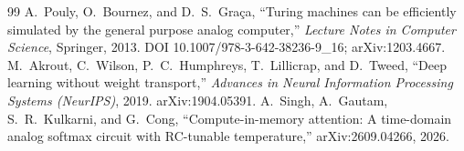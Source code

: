\documentclass[11pt]{article}
\begin{document}
\begin{thebibliography}{99}
 A.~Pouly, O.~Bournez, and D.~S.~Gra\c{c}a, ``Turing machines can be efficiently simulated by the general purpose analog computer,'' \textit{Lecture Notes in Computer Science}, Springer, 2013. DOI 10.1007/978-3-642-38236-9\_16; arXiv:1203.4667.
 M.~Akrout, C.~Wilson, P.~C.~Humphreys, T.~Lillicrap, and D.~Tweed, ``Deep learning without weight transport,'' \textit{Advances in Neural Information Processing Systems (NeurIPS)}, 2019. arXiv:1904.05391.
 A.~Singh, A.~Gautam, S.~R.~Kulkarni, and G.~Cong, ``Compute-in-memory attention: A time-domain analog softmax circuit with RC-tunable temperature,'' arXiv:2609.04266, 2026.
\end{thebibliography}
\end{document}
